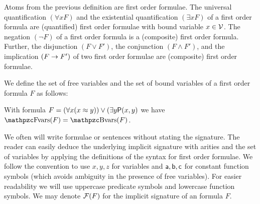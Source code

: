 
\begin{definition}\label{def:syntax:FOF}
	Atoms from the previous definition are {\myem first order formulae}.
	The universal quantification $(\forall x F)$
	and the existential quantification $(\exists x F)$
	of a first order formula are (quantified) first order formulae
	with {\myem bound} variable $x\in{\mathcal V}$.
	The negation $(\lnot F)$ of a first order formula
	is a (composite) first order formula.
	Further, the disjunction $(F \lor F')$,
	the conjunction $(F \land F') $,
	and the implication $(F \rightarrow F')$
	of two first order formulae
	are (composite) first order formulae.
\end{definition}

\begin{definition}\label{def:fof:fvars}\label{def:fof:bvars}
	We define the set of {\myem free} variables and the set of {\myem bound} variables
	of a first order formula $F$ as follows:
\end{definition}

\begin{example}
	With formula $F = (\forall x (x\approx y)) \lor (\exists y {\mathsf P}(x,y)$ we have $\fvar(F) = \bvar(F)$.
\end{example}

We often will write formulae or sentences
without stating the signature.
The reader can easily deduce the underlying {\myem implicit} signature with arities
and the set of variables by applying the definitions of the syntax for first order formulae.
We follow the convention to use $x,y,z$ for variables
and ${\mathsf a},{\mathsf b},{\mathsf c}$ for constant function symbols
(which avoids ambiguity in the presence of free variables).
For easier readability we will use uppercase predicate symbols and lowercase function symbols.
We may denote ${\mathcal F}(F)$ for the implicit signature of an formula $F$.

